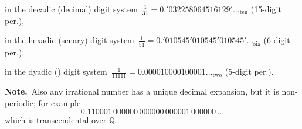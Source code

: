 \documentclass[12pt]{article}
\begin{document}
in the decadic (decimal) digit system\, $\frac{1}{31} = 0.'032258064516129'\ldots_{\mathrm{ten}}$ \quad(15-digit per.),

in the hexadic (senary) digit system\, $\frac{1}{51} = 0.'010545'010545'010545'\ldots_{\mathrm{six}}$ \quad(6-digit per.),

in the dyadic () digit system\, $\frac{1}{11111} = 0.000010000100001\ldots_{\mathrm{two}}$ \quad(5-digit per.).

\textbf{Note.} \,Also any irrational number has a unique decimal expansion, but it is non-periodic; for example  
    $$0.110001\,000000\,000000\,000001\,000000\,\ldots$$
which is transcendental over $\mathbb{Q}$.
\end{document}
